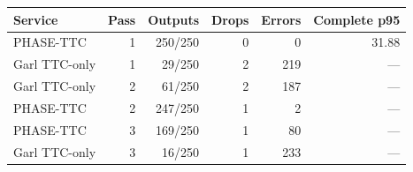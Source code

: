 \begin{tabular}{lrrrrr}
\toprule
Service & Pass & Outputs & Drops & Errors & Complete p95 \\
\midrule
PHASE-TTC & 1 & 250/250 & 0 & 0 & 31.88 \\
Garl TTC-only & 1 & 29/250 & 2 & 219 & --- \\
Garl TTC-only & 2 & 61/250 & 2 & 187 & --- \\
PHASE-TTC & 2 & 247/250 & 1 & 2 & --- \\
PHASE-TTC & 3 & 169/250 & 1 & 80 & --- \\
Garl TTC-only & 3 & 16/250 & 1 & 233 & --- \\
\bottomrule
\end{tabular}
